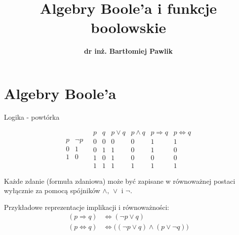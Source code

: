 \documentclass[a4paper,10pt]{beamer}
\title{\bf Algebry Boole'a i funkcje boolowskie}
\author[B. Pawlik]{\bf dr inż. Bartłomiej Pawlik}
\begin{document}
\begin{frame}
\titlepage
\end{frame}

\section{Algebry Boole'a}

\begin{frame}{Logika - powtórka}
	
	
	$$\begin{array}{c|c}
		p&\neg p\\\hline
		0&1\\
		1&0
	\end{array}\ \ \ 
	\begin{array}{cc|cccc}
	p&q&p\vee q&p\wedge q&p\Rightarrow q&p\Leftrightarrow q\\\hline
	0&0&0&0&1&1\\
	0&1&1&0&1&0\\
	1&0&1&0&0&0\\
	1&1&1&1&1&1
	\end{array}$$
	
	
	Każde zdanie (formuła zdaniowa) może być zapisane w równoważnej postaci wyłącznie za pomocą spójników $\wedge,\,\vee$ i $\neg$.
	
	\begin{block}{}
		Przykładowe reprezentacje implikacji i równoważności:
		\begin{align*}
			(p\Rightarrow q)&\iff(\neg p\vee q)\\ 
			(p\Leftrightarrow q)&\iff\big( (\neg p\vee q)\wedge(p\vee \neg q)\big)\\ 
		\end{align*}
	\end{block}

\end{frame}
\end{document}
